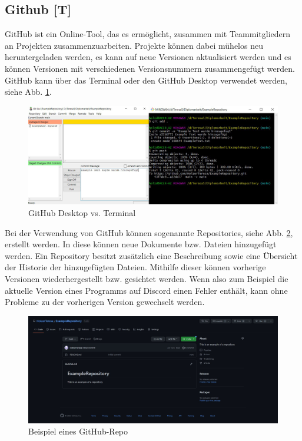 \subsection{Github [T]} 
GitHub ist ein Online-Tool, das es ermöglicht, zusammen mit Teammitgliedern an Projekten zusammenzuarbeiten. Projekte können dabei mühelos neu heruntergeladen werden, es kann auf neue Versionen aktualisiert werden und es können Versionen mit verschiedenen Versionsnummern zusammengefügt werden. GitHub kann über das Terminal oder den GitHub Desktop verwendet werden, siehe Abb. \ref{fig:impl:gitHubTerminalVSGUI}.


\begin{figure}[h t]
\centering
\includegraphics[scale=0.45]{pics/githubTerminalGUI.png}
\caption{GitHub Desktop vs. Terminal}
\label{fig:impl:gitHubTerminalVSGUI}
\end{figure}


Bei der Verwendung von GitHub können sogenannte Repositories, siehe Abb. \ref{fig:impl:githubRepository}, erstellt werden. In diese können neue Dokumente bzw. Dateien hinzugefügt werden. Ein Repository besitzt zusätzlich eine Beschreibung sowie eine Übersicht der Historie der hinzugefügten Dateien. Mithilfe dieser können vorherige Versionen wiederhergestellt bzw. gesichtet werden. Wenn also zum Beispiel die aktuelle Version eines Programms auf Discord einen Fehler enthält, kann ohne Probleme zu der vorherigen Version gewechselt werden.




\begin{figure}[h t]
\centering
\includegraphics[scale=0.38]{pics/exampleRepository.jpg}
\caption{Beispiel eines GitHub-Repo}
\label{fig:impl:githubRepository}
\end{figure}

